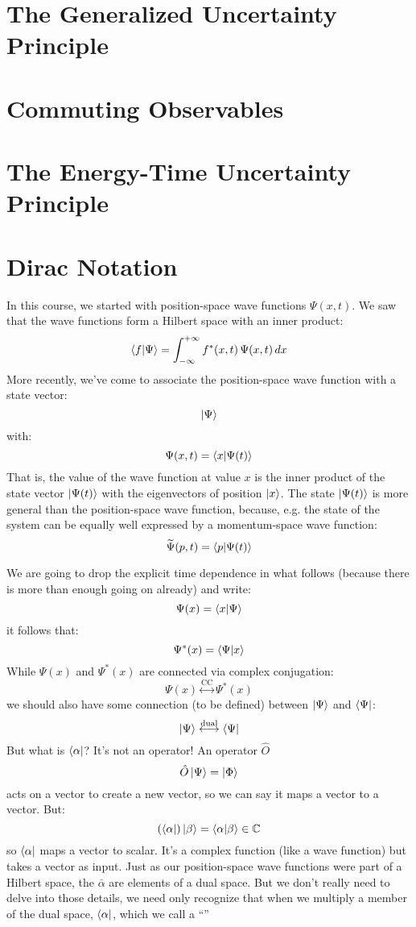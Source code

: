 \documentclass[12pt]{book}
\begin{document}
\section{The Generalized Uncertainty Principle}

\section{Commuting Observables}

\section{The Energy-Time Uncertainty Principle}

\section{Dirac Notation}

In this course, we started with position-space wave functions $\Psi(x,t)$.  We saw that the wave functions form a Hilbert space with an inner product:
$$\braket{f|\Psi} = \int_{-\infty}^{+\infty} f^*(x,t) \, \Psi(x,t) \, dx$$
More recently, we've come to associate the position-space wave function with a state vector:
$$\ket{\Psi}$$
with:
$$\Psi(x,t) = \braket{x|\Psi(t)}$$
That is, the value of the wave function at value $x$ is the inner product of the state vector 
$\ket{\Psi(t)}$ with the eigenvectors of position $\ket{x}$.  The state $\ket{\Psi(t)}$ is more general than the position-space wave function, because, e.g. the state of the system can be equally well expressed by a momentum-space wave function:
$$\widetilde{\Psi}(p,t) = \braket{p|\Psi(t)}$$

We are going to drop the explicit time dependence in what follows (because there is more than enough going on already) and write:
$$\Psi(x) = \braket{x|\Psi}$$
it follows that:
$$\Psi^*(x) = \braket{\Psi|x}$$
While $\Psi(x)$ and $\Psi^*(x)$ are connected via complex conjugation:
$$\Psi(x) \overset{\text{CC}}{\longleftrightarrow} \Psi^*(x)$$
we should also have some connection (to be defined) between $\ket{\Psi}$ and $\bra{\Psi}$:
$$\ket{\Psi} \overset{\text{dual}}{\longleftrightarrow} \bra{\Psi}$$
But what is $\bra{\alpha}$?  It's not an operator!  An operator $\hat{O}$
$$\hat{O} \ket{\Psi} = \ket{\Phi}$$
acts on a vector to create a new vector, so we can say it maps a vector to a vector.  But:
$$(\bra{\alpha}) \ket{\beta} = \braket{\alpha|\beta} \in \mathbb{C}$$
so $\bra{\alpha}$ maps a vector to scalar.  It's a complex function (like a wave function) but takes a vector as input.  Just as our position-space wave functions were part of a Hilbert space, the $\bar{\alpha}$ are elements of a dual space.  But we don't really need to delve into those details, we need only recognize that when we multiply a member of the dual space, $\bra{\alpha}$, which we call a ``\bra''
\end{document}
